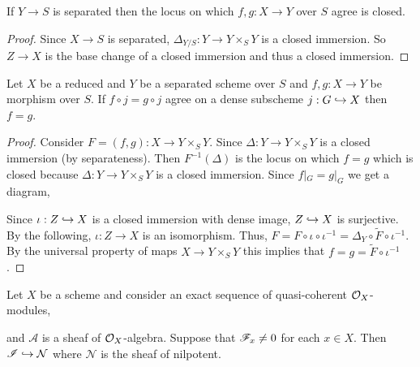 \documentclass[12pt]{article}
\begin{document}
\begin{lemma}
If $Y \to S$ is separated then the locus on which $f,g : X \to Y$ over $S$ agree is closed.
\end{lemma}

\begin{proof}
Since $X \to S$ is separated, $\Delta_{Y/S} : Y \to Y \times_S Y$ is a closed immersion. So $Z \to X$ is the base change of a closed immersion and thus a closed immersion. 
\end{proof}

\begin{lemma}
Let $X$ be a reduced and $Y$ be a separated scheme over $S$ and $f ,g : X \to Y$ be morphism over $S$. If $f \circ j = g \circ j$ agree on a dense subscheme $j : G \hookrightarrow X$ then $f = g$.
\end{lemma}

\begin{proof}
Consider $F = (f, g) : X \to Y \times_S Y$. Since $\Delta : Y \to Y \times_S Y$ is a closed immersion (by separateness). Then $F^{-1}(\Delta)$ is the locus on which $f = g$ which is closed because $\Delta : Y \to Y \times_S Y$ is a closed immersion. Since $f|_G = g|_G$ we get a diagram,
\begin{center}
\end{center}
Since $\iota : Z \hookrightarrow X$ is a closed immersion with dense image, $Z \hookrightarrow X$ is surjective. By the following, $\iota : Z \to X$ is an isomorphism. Thus, $F = F \circ \iota \circ \iota^{-1} = \Delta_Y \circ \tilde{F} \circ \iota^{-1}$. By the universal property of maps $X \to Y \times_S Y$ this implies that $f = g = \tilde{F} \circ \iota^{-1}$.
\end{proof}

\newcommand{\Nil}{\mathcal{N}}

\begin{lemma}
Let $X$ be a scheme and consider an exact sequence of quasi-coherent $\mathcal{O}_{X}$-modules,
\begin{center}
\end{center}
and $\mathcal{A}$ is a sheaf of $\mathcal{O}_{X}$-algebra. 
Suppose that $\mathscr{F}_x \neq 0$ for each $x \in X$. Then $\I \embed \Nil$ where $\Nil$ is the sheaf of nilpotent.
\end{lemma}
\end{document}
